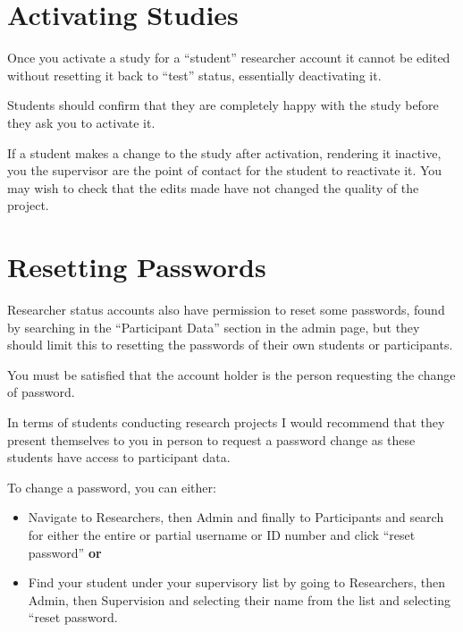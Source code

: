 \documentclass[]{book}
\begin{document}
\hypertarget{activating-studies}{%
\section*{Activating Studies}\label{activating-studies}}

\begin{warning}
Once you activate a study for a ``student'' researcher account it cannot
be edited without resetting it back to ``test'' status, essentially
deactivating it.

Students should confirm that they are completely happy with the study
before they ask you to activate it.

If a student makes a change to the study after activation, rendering it
inactive, you the supervisor are the point of contact for the student to
reactivate it. You may wish to check that the edits made have not
changed the quality of the project.
\end{warning}

\hypertarget{resetting-passwords}{%
\section*{Resetting Passwords}\label{resetting-passwords}}

Researcher status accounts also have permission to reset some passwords, found by searching in the ``Participant Data'' section in the admin page, but they should limit this to resetting the passwords of their own students or participants.

\begin{danger}
You must be satisfied that the account holder is the person requesting
the change of password.

In terms of students conducting research projects I would recommend that
they present themselves to you in person to request a password change as
these students have access to participant data.
\end{danger}

To change a password, you can either:

\begin{itemize}
\item
  Navigate to Researchers, then Admin and finally to Participants and search for either the entire or partial username or ID number and click ``reset password'' \textbf{or}
\item
  Find your student under your supervisory list by going to Researchers, then Admin, then Supervision and selecting their name from the list and selecting ``reset password.
\end{itemize}
\end{document}
